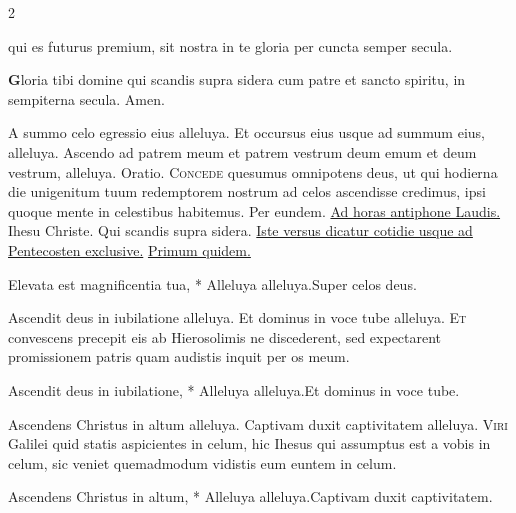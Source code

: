 \begin{multicols*}{2}
{qui es futurus premium,
sit nostra in te gloria
per cuncta semper secula.
\par {\bfseries \color{Red} G}loria tibi domine
qui scandis supra sidera
cum patre et sancto spiritu,
in sempiterna secula. Amen.
}
\newline \V A summo celo egressio eius alleluya. \R Et occursus eius usque ad summum eius, alleluya.
 Ascendo ad patrem meum et patrem vestrum deum emum et deum vestrum, alleluya. {\color{Red} Oratio.}
\lettrine[lines=2]{\zallmancaps \color{Blue} C}{oncede} \hypertarget{concede-ascensionis}{\label{concede-ascensionis}} quesumus omnipotens deus, ut qui hodierna die unigenitum tuum redemptorem nostrum ad celos ascendisse credimus, ipsi quoque mente in celestibus habitemus. Per eundem. \ul{Ad horas antiphone Laudis.}
 \R Ihesu Christe. \V Qui scandis supra sidera. \ul{Iste versus dicatur cotidie usque ad Pentecosten exclusive.}
 \hyperlink{primum-quidem-capitulum}{Primum quidem.}
\begin{responsory-breve}
{Elevata est magnificentia tua, * Alleluya alleluya.}{Super celos deus.}
\end{responsory-breve}%
\newline \V Ascendit deus in iubilatione alleluya. \R Et dominus in voce tube alleluya.
\lettrine[lines=2]{\zallmancaps \color{Red} E}{t} convescens precepit eis ab Hierosolimis ne discederent, sed expectarent promissionem patris quam audistis inquit per os meum.
\begin{responsory-breve}
{Ascendit deus in iubilatione, * Alleluya alleluya.}{Et dominus in voce tube.}
\end{responsory-breve}%
\newline \V Ascendens Christus in altum alleluya. \R Captivam duxit captivitatem alleluya.
\lettrine[lines=2]{\zallmancaps \color{Blue} V}{iri} Galilei quid statis aspicientes in celum, hic Ihesus qui assumptus est a vobis in celum, sic veniet quemadmodum vidistis eum euntem in celum.
\begin{responsory-breve}
{Ascendens Christus in altum, * Alleluya alleluya.}{Captivam duxit captivitatem.}

\end{responsory-breve}
\end{multicols*}
